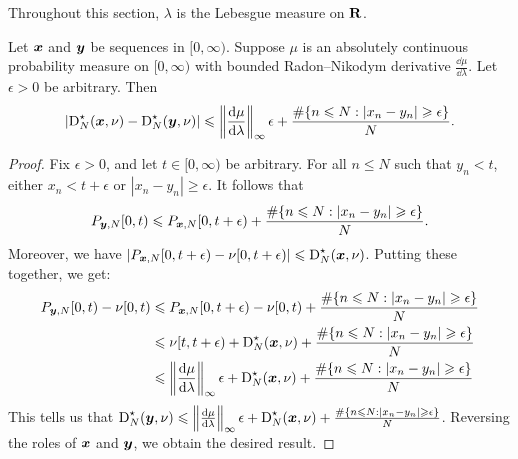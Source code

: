 Throughout this section, $\lambda$ is the Lebesgue measure on $\mathbf{R}$. 

\begin{lemma}\label{lem:disc-of-two-seq}
Let ${\boldsymbol x}$ and ${\boldsymbol y}$ be sequences in $[0,\infty)$. Suppose $\mu$ is an 
absolutely continuous probability measure on $[0,\infty)$ with bounded 
Radon--Nikodym derivative $\frac{\dd \mu}{\dd\lambda}$. Let $\epsilon>0$ be 
arbitrary. Then 
\[
	\left|\operatorname{D}_N^\star({\boldsymbol x}, \nu) - \operatorname{D}_N^\star({\boldsymbol y},\nu)\right| \leqslant \left\|\frac{\mathrm{d}\mu}{\mathrm{d}\lambda}\right\|_\infty \epsilon + \frac{\#\{ n\leqslant N : |x_n - y_n| \geqslant \epsilon\}}{N} .
\]
\end{lemma}
\begin{proof}
Fix $\epsilon>0$, and let $t\in [0,\infty)$ be arbitrary. For all 
$n\leqslant N$ such that $y_n<t$, either $x_n < t+\epsilon$ or 
$|x_n - y_n| \geqslant \epsilon$. It follows that 
\[
	P_{{\boldsymbol y},N}[0,t) \leqslant P_{{\boldsymbol x},N}[0,t+\epsilon) + \frac{\#\{ n\leqslant N : |x_n - y_n| \geqslant \epsilon\}}{N} .
\]
Moreover, we have 
$\left| P_{{\boldsymbol x},N}[0,t+\epsilon) - \nu[0,t+\epsilon)\right| \leqslant \operatorname{D}_N^\star({\boldsymbol x},\nu)$. Putting these together, we get: 
\begin{align*}
	P_{{\boldsymbol y},N}[0,t) - \nu[0,t) 
		&\leqslant P_{{\boldsymbol x},N}[0,t+\epsilon) - \nu[0,t) + \frac{\#\{ n\leqslant N : |x_n - y_n| \geqslant \epsilon\}}{N} \\
		&\leqslant \nu[t,t+\epsilon) + \operatorname{D}_N^\star({\boldsymbol x},\nu) + \frac{\#\{ n\leqslant N : |x_n - y_n| \geqslant \epsilon\}}{N} \\
		&\leqslant \left\|\frac{\mathrm{d}\mu}{\mathrm{d}\lambda}\right\|_\infty \epsilon + \operatorname{D}_N^\star({\boldsymbol x},\nu) + \frac{\#\{ n\leqslant N : |x_n - y_n| \geqslant \epsilon\}}{N} 
\end{align*}
This tells us that 
$\operatorname{D}_N^\star({\boldsymbol y},\nu) \leqslant \left\|\frac{\mathrm{d}\mu}{\mathrm{d}\lambda}\right\|_\infty \epsilon + \operatorname{D}_N^\star({\boldsymbol x},\nu) + \frac{\#\{ n\leqslant N : |x_n - y_n| \geqslant \epsilon\}}{N}$. 
Reversing the roles of ${\boldsymbol x}$ and ${\boldsymbol y}$, we obtain the desired result. 
\end{proof}

